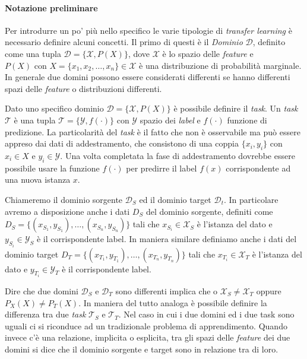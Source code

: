 \paragraph{Notazione preliminare}
Per introdurre un po' più nello specifico le varie tipologie di \textit{transfer learning} è necessario definire alcuni concetti. Il primo di questi è il \textit{Dominio} $\mathcal{D}$, definito come una tupla $\mathcal{D} = \{\mathcal{X}, P(X)\}$, dove $\mathcal{X}$ è lo spazio delle \textit{feature} e $P(X) \text{ con } X = \{x_1, x_2, \dots, x_n\} \in \mathcal{X}$ è una distribuzione di probabilità marginale. In generale due domini possono essere considerati differenti se hanno differenti spazi delle \textit{feature} o distribuzioni differenti. 

Dato uno specifico dominio $\mathcal{D} = \{\mathcal{X}, P(X)\}$ è possibile definire il \textit{task}. Un \textit{task} $\mathcal{T}$ è una tupla $\mathcal{T} = \{\mathcal{Y},f(\cdot)\}$ con $\mathcal{Y}$ spazio dei \textit{label} e $f(\cdot)$ funzione di predizione. La particolarità del \textit{task} è il fatto che non è osservabile ma può essere appreso dai dati di addestramento, che consistono di una coppia $\{x_i, y_i\}$ con $x_i \in X$ e $y_i \in \mathcal{Y}$. Una volta completata la fase di addestramento dovrebbe essere possibile usare la funzione $f(\cdot)$ per predirre il label $f(x)$ corrispondente ad una nuova istanza $x$.

Chiameremo il dominio sorgente $\mathcal{D}_S$ ed il dominio target $\mathcal{D}_t$. In particolare avremo a disposizione anche i dati $D_S$ del dominio sorgente, definiti 
come $D_S = \{(x_{S_1}, y_{S_1}), \dots, (x_{S_n}, y_{S_n})\}$ tali che $x_{S_i} \in \mathcal{X}_S$ è l'istanza del dato e $y_{S_i} \in \mathcal{Y}_S$ è il corrispondente label. In maniera similare definiamo anche i dati del dominio target $D_T = \{(x_{T_1}, y_{T_1}), \dots, (x_{T_n}, y_{T_n})\} $ tali che $x_{T_i} \in \mathcal{X}_T$ è l'istanza del dato e $y_{T_i} \in \mathcal{Y}_T$ è il corrispondente label. 

Dire che due domini $\mathcal{D}_S$ e $\mathcal{D}_T$ sono differenti implica che  o $\mathcal{X}_S \neq \mathcal{X}_T$ oppure $P_X(X) \neq P_T(X)$. In maniera del tutto analoga è possibile definire la differenza tra due \textit{task} $\mathcal{T}_S \text{ e } \mathcal{T}_T$. Nel caso in cui i due domini ed i due task sono uguali ci si riconduce ad un tradizionale problema di apprendimento. Quando invece c'è una relazione, implicita o esplicita, tra gli spazi delle \textit{feature} dei due domini si dice che il dominio sorgente e target sono in relazione tra di loro.
